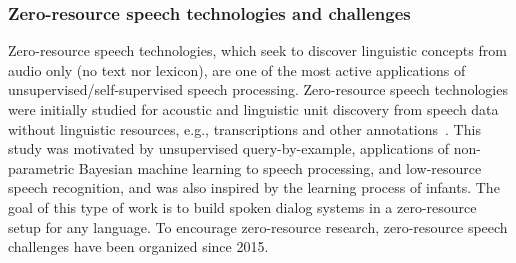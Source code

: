 
\subsubsection{Zero-resource speech technologies and challenges}
\label{zero_speech}
Zero-resource speech technologies, which seek to discover linguistic concepts
from audio only (no text nor lexicon), are one of the most active applications
of unsupervised/self-supervised speech processing.
Zero-resource speech technologies were initially studied for acoustic and
linguistic unit discovery from speech data without linguistic resources,
e.g., transcriptions and other annotations~\cite{jansen_summary_2013}.
This study was motivated by unsupervised query-by-example, applications of
non-parametric Bayesian machine learning to speech processing, and low-resource
speech recognition, and was also inspired by the learning process of infants.
The goal of this type of work is to build spoken dialog systems in a zero-resource
setup for any language.
  To encourage      zero-resource research,                  %
zero-resource speech challenges have been organized since 2015.

